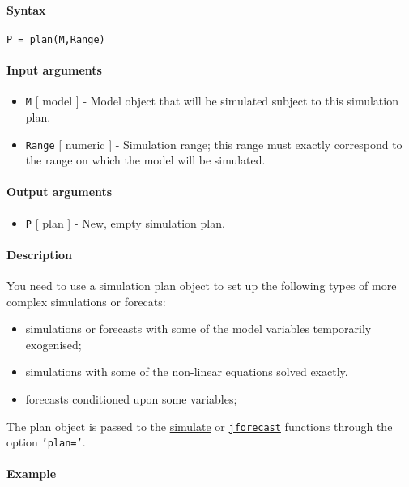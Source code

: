 


	\paragraph{Syntax}\label{syntax}

\begin{verbatim}
P = plan(M,Range)
\end{verbatim}

\paragraph{Input arguments}\label{input-arguments}

\begin{itemize}
\item
  \texttt{M} {[} model {]} - Model object that will be simulated subject
  to this simulation plan.
\item
  \texttt{Range} {[} numeric {]} - Simulation range; this range must
  exactly correspond to the range on which the model will be simulated.
\end{itemize}

\paragraph{Output arguments}\label{output-arguments}

\begin{itemize}
\itemsep1pt\parskip0pt
\item
  \texttt{P} {[} plan {]} - New, empty simulation plan.
\end{itemize}

\paragraph{Description}\label{description}

You need to use a simulation plan object to set up the following types
of more complex simulations or forecats:

\begin{itemize}
\item
  simulations or forecasts with some of the model variables temporarily
  exogenised;
\item
  simulations with some of the non-linear equations solved exactly.
\item
  forecasts conditioned upon some variables;
\end{itemize}

The plan object is passed to the \href{model/simulate}{simulate} or
\href{model/jforecast}{\texttt{jforecast}} functions through the option
\texttt{'plan='}.

\paragraph{Example}\label{example}


